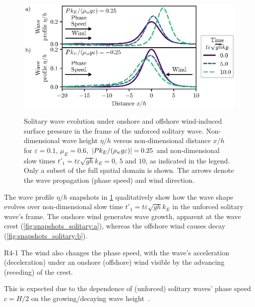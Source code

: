 \documentclass{jfm}
\renewcommand*{\epsilon}{\varepsilon}
\begin{document}
\begin{figure}
  \centering
  { %
    \label{fig:snapshots_solitary:a}
    \label{fig:snapshots_solitary:b}
  }
  \includegraphics{Snapshots-Positive-Negative-Production.eps}
  \caption{
    Solitary wave evolution under
    onshore and
    offshore wind-induced surface pressure in the frame of the unforced
    solitary wave.
    Non-dimensional wave height $\eta/h$ versus
    non-dimensional distance $x/h$ for $\epsilon=0.1$,
    $\mu_E = 0.6$, $\abs{P k_E/(\rho_w g \epsilon)} = 0.25$ and
    non-dimensional slow times $t'_1 = t \epsilon \sqrt{gh} k_E = 0$,
    $5$ and $10$, as indicated in the legend.
    Only a subset of the full spatial domain is shown.
    The arrows denote the wave propagation (phase speed) and wind
    direction.
  }\label{fig:snapshots_solitary}
\end{figure}

The wave profile $\eta/h$ snapshots in \cref{fig:snapshots_solitary}
qualitatively show how the wave shape evolves over non-dimensional slow
time $t'_1 = t \epsilon \sqrt{g h} k_E$ in the unforced solitary wave's
frame.
The onshore wind generates wave growth, apparent at the wave
crest (\cref{fig:snapshots_solitary:a}), whereas the offshore wind causes
decay (\cref{fig:snapshots_solitary:b}).
\begin{LineLabel}{R4-1}
The wind also changes the phase speed, with the wave's acceleration
(deceleration) under an onshore (offshore) wind visible by the advancing
(receding) of the crest.
\end{LineLabel}
This is expected due to the dependence of (unforced) solitary waves' phase
speed $c = H/2$ on the growing/decaying wave
height~\cite[\eg][]{mei2005nonlinear}.
\end{document}
